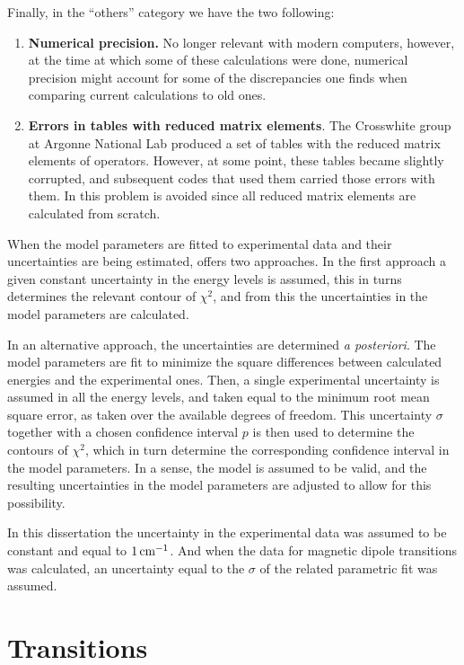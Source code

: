 \documentclass[11pt, twoside,openright]{article}
\begin{document}
Finally, in the ``others'' category we have the two following:

\begin{enumerate}
\item \textbf{Numerical precision.} No longer relevant with modern computers, however, at the time at which some of these calculations were done, numerical precision might account for some of the discrepancies one finds when comparing current calculations to old ones.
\item \textbf{Errors in tables with reduced matrix elements}. The Crosswhite group at Argonne National Lab produced a set of tables with the reduced matrix elements of operators. However, at some point, these tables became slightly corrupted, and subsequent codes that used them carried those errors with them. In \qlanth this problem is avoided since all reduced matrix elements are calculated from scratch.
\end{enumerate}

When the model parameters are fitted to experimental data and their uncertainties are being estimated, \qlanth offers two approaches. In the first approach a given constant uncertainty in the energy levels is assumed, this in turns determines the relevant contour of $\chi^2$, and from this the uncertainties in the model parameters are calculated.

In an alternative approach, the uncertainties are determined \textit{a posteriori}. The model parameters are fit to minimize the square differences between calculated energies and the experimental ones. Then, a single experimental uncertainty is assumed in all the energy levels, and taken equal to the minimum root mean  square error, as taken over the available degrees of freedom. This uncertainty $\sigma$ together with a chosen confidence interval $p$ is then used to determine the contours of $\chi^2$, which in turn determine the corresponding confidence interval in the model parameters. In a sense, the model is assumed to be valid, and the resulting uncertainties in the model parameters are adjusted to allow for this possibility.

In this dissertation the uncertainty in the experimental data was assumed to be constant and equal to $1 \,\text{cm}^{-1}$. And when the data for magnetic dipole transitions was calculated, an uncertainty equal to the $\sigma$ of the related parametric fit was assumed. 

\section{Transitions}\label{section:transitions}
\end{document}

